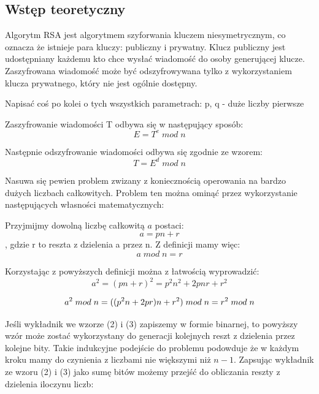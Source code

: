 \documentclass{article}
\begin{document}
\subsection{Wstęp teoretyczny}
Algorytm RSA jest algorytmem szyforwania kluczem niesymetrycznym, co oznacza że istnieje para kluczy: publiczny i prywatny. Klucz publiczny jest udostępniany każdemu kto chce wysłać wiadomość do osoby generującej klucze. Zaszyfrowana wiadomość może być odszyfrowywana tylko z wykorzystaniem klucza prywatnego, który nie jest ogólnie dostępny.

Napisać coś po kolei o tych wszystkich parametrach:
p, q - duże liczby pierwsze

Zaszyfrowanie wiadomości T odbywa się w następujący sposób:
\begin{equation}
	E = T^e \; mod \; n
\end{equation}

Następnie odszyfrowanie wiadomości odbywa się zgodnie ze wzorem:
\begin{equation}
	T = E^d \; mod \; n
\end{equation}

Nasuwa się pewien problem zwizany z koniecznością operowania na bardzo dużych liczbach całkowitych. Problem ten można ominąć przez wykorzystanie następujących własności matematycznych:

Przyjmijmy dowolną liczbę całkowitą $a$ postaci:
\begin{equation}
	a = pn + r
\end{equation}
, gdzie r to reszta z dzielenia a przez n. Z definicji mamy więc:
\begin{equation}
	a \; mod \; n = r
\end{equation}

Korzystając z powyższych definicji można z łatwością wyprowadzić:
\begin{equation}
	a^2 = (pn + r)^2 = p^2 n^2 + 2 p n r + r^2
\end{equation}

\begin{equation}
	a^2 \; mod \; n = ((p^2 n + 2 p r) n + r^2) \; mod \; n \\
	= r^2 \; mod \; n
\end{equation}

Jeśli wykładnik we wzorze (2) i (3) zapiszemy w formie binarnej, to powyższy wzór może zostać wykorzystany do generacji kolejnych reszt z dzielenia przez kolejne bity. Takie indukcyjne podejście do problemu podowduje że w każdym kroku mamy do czynienia z liczbami nie większymi niż $n - 1$. Zapsując wykładnik ze wzoru (2) i (3) jako sumę bitów możemy przejść do obliczania reszty z dzielenia iloczynu liczb:
\end{document}
